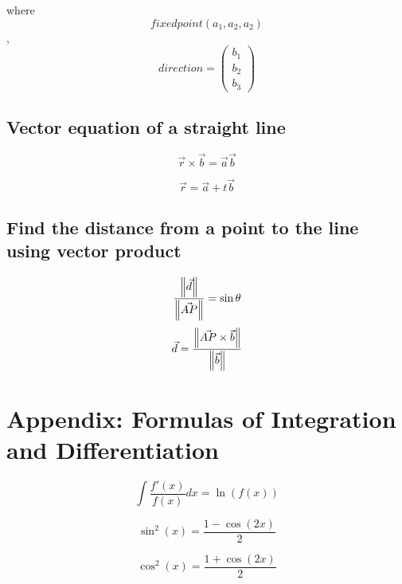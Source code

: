 \documentclass[a4paper,9pt]{scrartcl}
\begin{document}
    where \begin{displaymath}
              fixed point (a_1, a_2, a_2)
    \end{displaymath},
    \begin{displaymath}
        direction = \begin{pmatrix}
                        b_1 \\ b_2 \\ b_3
        \end{pmatrix}
    \end{displaymath}

    \subsection{Vector equation of a straight line}
    \begin{displaymath}
        \vec{r}\times\vec{b} = \vec{a}\vec{b}
    \end{displaymath}

    \begin{displaymath}
        \vec{r} = \vec{a} + t\vec{b}
    \end{displaymath}

    \subsection{Find the distance from a point to the line using vector product}
    \begin{displaymath}
        \frac{\left\| \vec{d} \right\|}{\left\| \vec{AP} \right\|} = \sin\theta
    \end{displaymath}
    \begin{displaymath}
        \vec{d} = \frac{\left\| \vec{AP}\times\vec{b} \right\|}{\left\| \vec{b} \right\|}
    \end{displaymath}


    \section{Appendix: Formulas of Integration and Differentiation}

    \begin{displaymath}
        \int \frac{f'(x)}{f(x)} dx = \ln(f(x))
    \end{displaymath}

    \begin{displaymath}
        \sin^2(x) = \frac{1-\cos(2x)}{2}
    \end{displaymath}

    \begin{displaymath}
        \cos^2(x) = \frac{1+\cos(2x)}{2}
    \end{displaymath}
\end{document}

